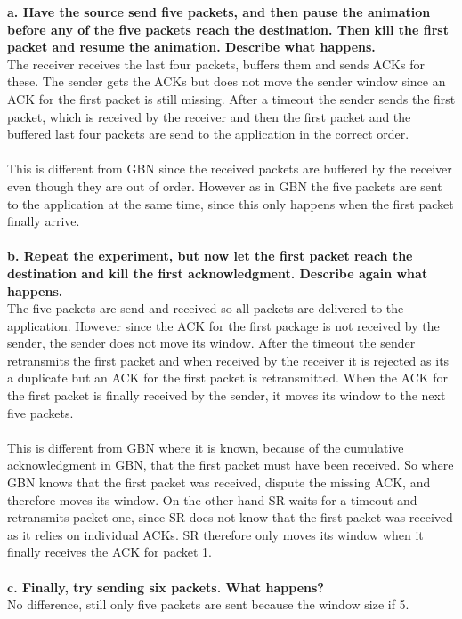 \textbf{a. Have the source send five packets, and then pause the animation before any of the five packets reach the destination. Then kill the first packet and resume the animation. Describe what happens.} \\
The receiver receives the last four packets, buffers them and sends ACKs for these. The sender gets the ACKs but does not move the sender window since an ACK for the first packet is still missing. After a timeout the sender sends the first packet, which is received by the receiver and then the first packet and the buffered last four packets are send to the application in the correct order. \\
\\
This is different from GBN since the received packets are buffered by the receiver even though they are out of order. However as in GBN the five packets are sent to the application at the same time, since this only happens when the first packet finally arrive. \\
\\
\textbf{b. Repeat the experiment, but now let the first packet reach the destination and kill the first acknowledgment. Describe again what happens.} \\
The five packets are send and received so all packets are delivered to the application. However since the ACK for the first package is not received by the sender, the sender does not move its window. After the timeout the sender retransmits the first packet and when received by the receiver it is rejected as its a duplicate but an ACK for the first packet is retransmitted. When the ACK for the first packet is finally received by the sender, it moves its window to the next five packets. \\
\\
This is different from GBN where it is known, because of the cumulative acknowledgment in GBN, that the first packet must have been received. So where GBN knows that the first packet was received, dispute the missing ACK, and therefore moves its window. On the other hand SR waits for a timeout and retransmits packet one, since SR does not know that the first packet was received as it relies on individual ACKs. SR therefore only moves its window when it finally receives the ACK for packet 1.\\
\\
\textbf{c. Finally, try sending six packets. What happens?} \\
No difference, still only five packets are sent because the window size if 5.